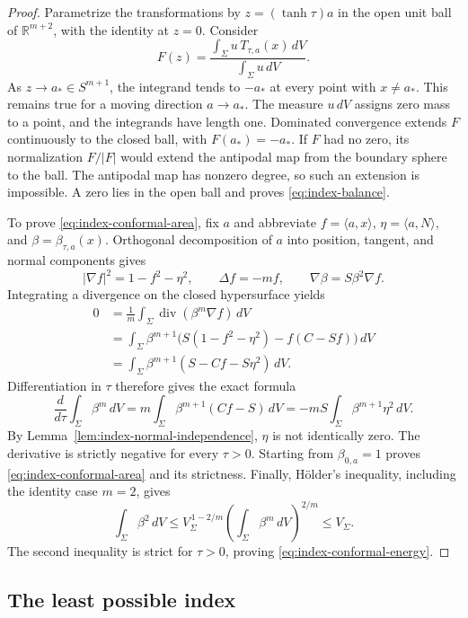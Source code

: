 \begin{proof}
Parametrize the transformations by $z=(\tanh\tau)a$ in the open unit ball
of $\mathbb R^{m+2}$, with the identity at $z=0$.  Consider
\[
 F(z)=\frac{\int_\Sigma u\,T_{\tau,a}(x)\,dV}
                  {\int_\Sigma u\,dV}.
\]
As $z\to a_*\in S^{m+1}$, the integrand tends to $-a_*$ at every point
with $x\ne a_*$.  This remains true for a moving direction $a\to a_*$.
The measure $u\,dV$ assigns zero mass to a point, and the integrands have
length one.  Dominated convergence extends $F$ continuously to the
closed ball, with $F(a_*)=-a_*$.  If $F$ had no zero, its normalization
$F/|F|$ would extend the antipodal map from the boundary sphere to the
ball.  The antipodal map has nonzero degree, so such an extension is
impossible.  A zero lies in the open ball and proves
\eqref{eq:index-balance}.

To prove \eqref{eq:index-conformal-area}, fix $a$ and abbreviate
$f=\langle a,x\rangle$, $\eta=\langle a,N\rangle$, and
$\beta=\beta_{\tau,a}(x)$.  Orthogonal decomposition of $a$ into position,
tangent, and normal components gives
\[
 |\nabla f|^2=1-f^2-\eta^2,\qquad
 \Delta f=-mf,\qquad \nabla\beta=S\beta^2\nabla f.
\]
Integrating a divergence on the closed hypersurface yields
\begin{align*}
 0&=\frac1m\int_\Sigma\operatorname{div}(\beta^m\nabla f)\,dV\\
  &=\int_\Sigma\beta^{m+1}
            \bigl(S(1-f^2-\eta^2)-f(C-Sf)\bigr)\,dV\\
  &=\int_\Sigma\beta^{m+1}(S-Cf-S\eta^2)\,dV.
\end{align*}
Differentiation in $\tau$ therefore gives the exact formula
\begin{equation}\label{eq:index-area-derivative}
 \frac{d}{d\tau}\int_\Sigma\beta^m\,dV
   =m\int_\Sigma\beta^{m+1}(Cf-S)\,dV
   =-mS\int_\Sigma\beta^{m+1}\eta^2\,dV.
\end{equation}
By Lemma~\ref{lem:index-normal-independence}, $\eta$ is not identically
zero.  The derivative is strictly negative for every $\tau>0$.
Starting from $\beta_{0,a}=1$ proves \eqref{eq:index-conformal-area}
and its strictness.  Finally, H\"older's inequality, including the
identity case $m=2$, gives
\[
 \int_\Sigma\beta^2\,dV
 \le V_\Sigma^{\,1-2/m}
          \left(\int_\Sigma\beta^m\,dV\right)^{2/m}
 \le V_\Sigma.
\]
The second inequality is strict for $\tau>0$, proving
\eqref{eq:index-conformal-energy}.
\end{proof}

\subsection{The least possible index}

